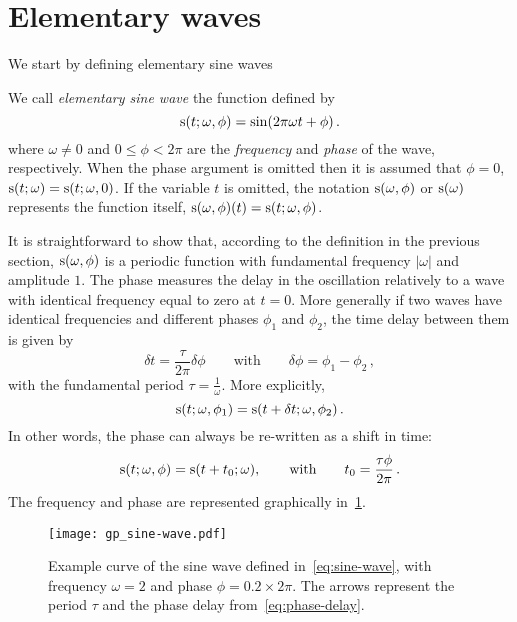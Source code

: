 \section{Elementary waves}
We start by defining elementary sine waves
\begin{definition}
  \label{def:sine-wave}
  We call \emph{elementary sine wave} the function defined by
  \begin{equation}
    \operatorname{s}(t;\omega,\phi)=\sin(2\pi\omega t + \phi)\,.\label{eq:sine-wave}
  \end{equation}
  where $\omega\neq 0$ and $0\leq\phi<2\pi$ are the \emph{frequency} and \emph{phase} of
  the wave, respectively. When the phase argument is omitted then it is assumed that
  $\phi=0$, \ie $\operatorname{s}(t;\omega)=\operatorname{s}(t;\omega,0)$. If the variable $t$ is omitted, the
  notation $\operatorname{s}(\omega,\phi)$ or $\operatorname{s}(\omega)$ represents the function itself, \ie
  $\operatorname{s}(\omega,\phi)(t)=\operatorname{s}(t;\omega,\phi)$.
\end{definition}
It is straightforward to show that, according to the definition in the previous
section, $\operatorname{s}(\omega,\phi)$ is a periodic function with fundamental frequency $|\omega|$
and amplitude $1$. The phase measures the delay in the oscillation relatively to a wave
with identical frequency equal to zero at $t=0$. More generally if two waves have
identical frequencies and different phases $\phi_1$ and $\phi_2$, the time delay between
them is given by
\begin{equation}
  \delta t =\frac{\tau}{2\pi}\delta\phi\qquad\text{with}\qquad\delta\phi=\phi_1-\phi_2\,,
\end{equation}
with the fundamental period $\tau=\frac{1}{\omega}$. More explicitly,
\begin{equation}
  \operatorname{s}(t;\omega,\phi_1)=\operatorname{s}(t+\delta t;\omega,\phi_2)\,.
\end{equation}
In other words, the phase can always be re-written as a shift in time:
\begin{equation}
  \operatorname{s}(t;\omega,\phi)=\operatorname{s}(t+t_0;\omega),
  \qquad\text{with}\qquad
  t_0 = \frac{\tau\phi}{2\pi}\,.\label{eq:phase-delay}
\end{equation}
The frequency and phase are represented graphically in~\cref{fig:sine-wave}.
\begin{figure}[t]
  \centering
  \texttt{[image: gp\_sine-wave.pdf]}
  \caption{Example curve of the sine wave defined in~\cref{eq:sine-wave}, with frequency
    $\omega=2$ and phase $\phi=0.2\times 2\pi$. The arrows represent the period $\tau$ and
  the phase delay from~\cref{eq:phase-delay}.}
  \label{fig:sine-wave}
\end{figure}
